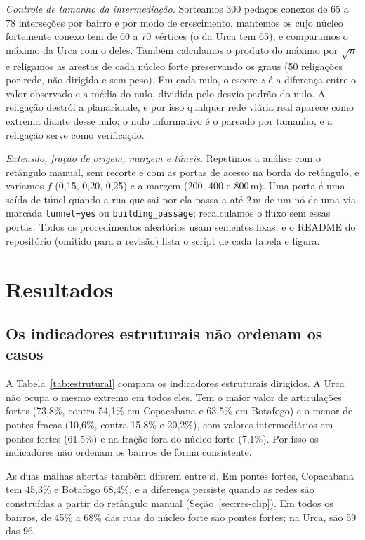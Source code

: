 \emph{Controle de tamanho da intermediação.} Sorteamos 300 pedaços
conexos de 65 a 78 interseções por bairro e por modo de crescimento,
mantemos os cujo núcleo fortemente conexo tem de 60 a 70 vértices (o da
Urca tem 65), e comparamos o máximo da Urca com o deles. Também
calculamos o produto do máximo por $\sqrt{n}$ e religamos as arestas de cada núcleo forte preservando os graus (50 religações por rede, não dirigida e
sem peso). Em cada nulo, o escore $z$ é a diferença entre o valor
observado e a média do nulo, dividida pelo desvio padrão do nulo. A
religação destrói a planaridade, e por isso qualquer rede viária real
aparece como extrema diante desse nulo; o nulo informativo é o pareado
por tamanho, e a religação serve como verificação.

\emph{Extensão, fração de origem, margem e túneis.} Repetimos a análise
com o retângulo manual, sem recorte e com as portas de acesso na borda
do retângulo, e variamos $f$ (0,15, 0,20, 0,25) e a margem (200, 400 e
800\,m). Uma porta é uma saída de túnel quando a rua que sai por ela
passa a até 2\,m de um nó de uma via marcada \texttt{tunnel=yes} ou
\texttt{building\_passage}; recalculamos o fluxo sem essas portas. Todos
os procedimentos aleatórios usam sementes fixas, e o README do
repositório (omitido para a revisão) lista o script de cada tabela e
figura.

\section{Resultados}
\label{sec:results}

\subsection{Os indicadores estruturais não ordenam os casos}
\label{sec:res-struct}

A Tabela~\ref{tab:estrutural} compara os indicadores estruturais
dirigidos. A Urca não ocupa o mesmo extremo em todos eles. Tem o maior
valor de articulações fortes (73,8\%, contra 54,1\% em Copacabana e
63,5\% em Botafogo) e o menor de pontes fracas (10,6\%, contra 15,8\% e
20,2\%), com valores intermediários em pontes fortes (61,5\%) e na
fração fora do núcleo forte (7,1\%). Por isso os indicadores não
ordenam os bairros de forma consistente.

As duas malhas abertas também diferem entre si. Em pontes fortes,
Copacabana tem 45,3\% e Botafogo 68,4\%, e a diferença persiste quando
as redes são construídas a partir do retângulo manual
(Seção~\ref{sec:res-clip}). Em todos os bairros, de 45\% a 68\% das
ruas do núcleo forte são pontes fortes; na Urca, são 59 das 96.

